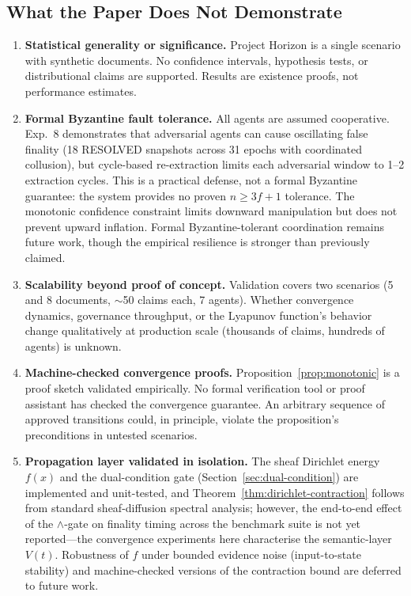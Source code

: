 \documentclass[11pt]{article}
\begin{document}
\subsection{What the Paper Does Not Demonstrate}

\begin{enumerate}
  \item \textbf{Statistical generality or significance.} Project Horizon is a single scenario with synthetic documents. No confidence intervals, hypothesis tests, or distributional claims are supported. Results are existence proofs, not performance estimates.
  \item \textbf{Formal Byzantine fault tolerance.} All agents are assumed cooperative. Exp.~8 demonstrates that adversarial agents can cause oscillating false finality (18 RESOLVED snapshots across 31 epochs with coordinated collusion), but cycle-based re-extraction limits each adversarial window to 1--2 extraction cycles. This is a practical defense, not a formal Byzantine guarantee: the system provides no proven $n \geq 3f+1$ tolerance. The monotonic confidence constraint limits downward manipulation but does not prevent upward inflation. Formal Byzantine-tolerant coordination \cite{lamport1982,castro1999,zheng2025} remains future work, though the empirical resilience is stronger than previously claimed.
  \item \textbf{Scalability beyond proof of concept.} Validation covers two scenarios (5 and 8 documents, $\sim$50 claims each, 7 agents). Whether convergence dynamics, governance throughput, or the Lyapunov function's behavior change qualitatively at production scale (thousands of claims, hundreds of agents) is unknown.
  \item \textbf{Machine-checked convergence proofs.} Proposition~\ref{prop:monotonic} is a proof sketch validated empirically. No formal verification tool or proof assistant has checked the convergence guarantee. An arbitrary sequence of approved transitions could, in principle, violate the proposition's preconditions in untested scenarios.
  \item \textbf{Propagation layer validated in isolation.} The sheaf Dirichlet energy $f(x)$ and the dual-condition gate (Section~\ref{sec:dual-condition}) are implemented and unit-tested, and Theorem~\ref{thm:dirichlet-contraction} follows from standard sheaf-diffusion spectral analysis; however, the end-to-end effect of the $\wedge$-gate on finality timing across the benchmark suite is not yet reported---the convergence experiments here characterise the semantic-layer $V(t)$. Robustness of $f$ under bounded evidence noise (input-to-state stability) and machine-checked versions of the contraction bound are deferred to future work.

\end{enumerate}
\end{document}

